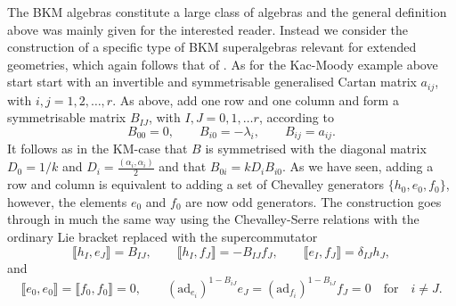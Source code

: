 The BKM algebras constitute a large class of algebras and the general definition above was mainly given for the interested reader. Instead we consider the construction of a specific type of BKM superalgebras relevant for extended geometries, which again follows that of \cite{CederwallPalmkvist2017}. As for the Kac-Moody example above start start with an invertible and symmetrisable generalised Cartan matrix $a_{ij}$, with $i,j=1,2,\ldots,r$. As above, add one row and one column and form a symmetrisable matrix $B_{IJ}$, with $I,J=0,1,\ldots r$, according to 
\begin{equation}
    B_{00} = 0,\qquad B_{i0} = -\lambda_i,\qquad B_{ij} = a_{ij}.
\end{equation}
It follows as in the KM-case that $B$ is symmetrised with the diagonal matrix $D_0=1/k$ and $D_i=\frac{(\alpha_i,\alpha_i)}{2}$ and that $B_{0i}=kD_iB_{i0}$. As we have seen, adding a row and column is equivalent to adding a set of Chevalley generators $\{h_0,e_0,f_0\}$, however, the elements $e_0$ and $f_0$ are now odd generators. The construction goes through in much the same way using the Chevalley-Serre relations with the ordinary Lie bracket replaced with the supercommutator 
\begin{equation}
    \llbracket h_I,e_J\rrbracket = B_{IJ},\qquad \llbracket h_I,f_J\rrbracket = -B_{IJ}f_J,\qquad \llbracket e_I,f_J\rrbracket = \delta_{IJ}h_J,
\end{equation}
and 
\begin{equation}
    \llbracket e_0,e_0\rrbracket = \llbracket f_0,f_0\rrbracket = 0,\qquad (\text{ad}_{e_i})^{1-B_{iJ}}e_J = (\text{ad}_{f_i})^{1-B_{iJ}}f_J = 0 \quad \text{for} \quad i\neq J.
\end{equation}

